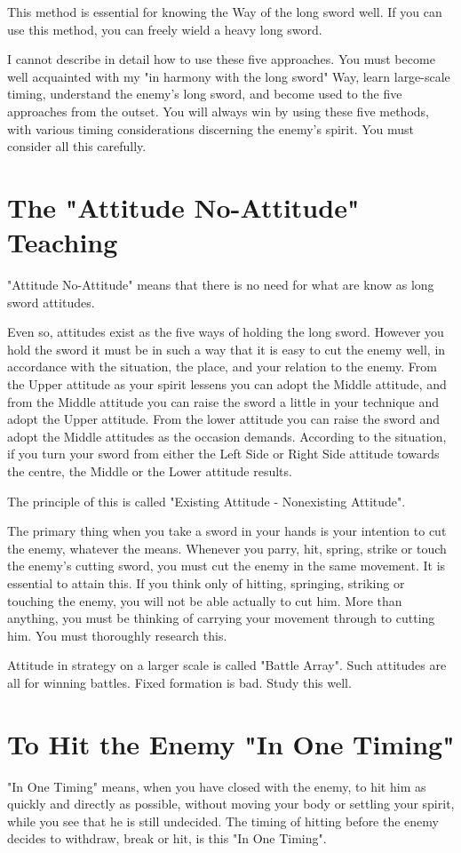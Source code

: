 \documentclass[12pt]{report}
\begin{document}
This method is essential for knowing the Way of the long sword well. If you can use this method, you can freely wield a heavy long sword.

I cannot describe in detail how to use these five approaches. You must become well acquainted with my "in harmony with the long sword" Way, learn large-scale timing, understand the enemy's long sword, and become used to the five approaches from the outset. You will always win by using these five methods, with various timing considerations discerning the enemy's spirit. You must consider all this carefully.
\section*{The "Attitude No-Attitude" Teaching}
"Attitude No-Attitude" means that there is no need for what are know as long sword attitudes.

Even so, attitudes exist as the five ways of holding the long sword. However you hold the sword it must be in such a way that it is easy to cut the enemy well, in accordance with the situation, the place, and your relation to the enemy. From the Upper attitude as your spirit lessens you can adopt the Middle attitude, and from the Middle attitude you can raise the sword a little in your technique and adopt the Upper attitude. From the lower attitude you can raise the sword and adopt the Middle attitudes as the occasion demands. According to the situation, if you turn your sword from either the Left Side or Right Side attitude towards the centre, the Middle or the Lower attitude results.

The principle of this is called "Existing Attitude - Nonexisting Attitude".

The primary thing when you take a sword in your hands is your intention to cut the enemy, whatever the means. Whenever you parry, hit, spring, strike or touch the enemy's cutting sword, you must cut the enemy in the same movement. It is essential to attain this. If you think only of hitting, springing, striking or touching the enemy, you will not be able actually to cut him. More than anything, you must be thinking of carrying your movement through to cutting him. You must thoroughly research this.

Attitude in strategy on a larger scale is called "Battle Array". Such attitudes are all for winning battles. Fixed formation is bad. Study this well.
\section*{To Hit the Enemy "In One Timing"}
"In One Timing" means, when you have closed with the enemy, to hit him as quickly and directly as possible, without moving your body or settling your spirit, while you see that he is still undecided. The timing of hitting before the enemy decides to withdraw, break or hit, is this "In One Timing".
\end{document}
